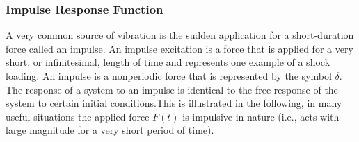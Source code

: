 \documentclass[12pt,letter]{article}
\newtheorem{ex}{Example}
\numberwithin{ex}{section} %
\newenvironment{example}{\begin{mdframed}[middlelinewidth=0.5mm]\begin{ex}\normalfont}{\end{ex}\end{mdframed}}
\numberwithin{re}{section} %
\newcommand{\Laplace}[1]{\ensuremath{\mathcal{L}{\left[#1\right]}}}
\begin{document}

\subsubsection{Impulse Response Function}
A very common source of vibration is the sudden application for a short-duration force called an impulse. An impulse excitation is a force that is applied for a very short, or infinitesimal, length of time and represents one example of a shock loading. An impulse is a nonperiodic force that is represented by the symbol $\delta$. The response of a system to an impulse is identical to the free response of the system to certain initial conditions.This is illustrated in the following, in many useful situations the applied force $F(t)$ is impulsive in nature
(i.e., acts with large magnitude for a very short period of time).
\end{document}
